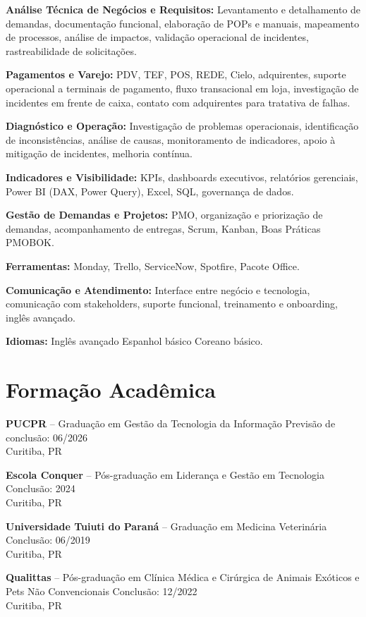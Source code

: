 \documentclass[11pt,a4paper]{article}
\begin{document}
\textbf{Análise Técnica de Negócios e Requisitos:} Levantamento e detalhamento de demandas, documentação funcional, elaboração de POPs e manuais, mapeamento de processos, análise de impactos, validação operacional de incidentes, rastreabilidade de solicitações.

\textbf{Pagamentos e Varejo:} PDV, TEF, POS, REDE, Cielo, adquirentes, suporte operacional a terminais de pagamento, fluxo transacional em loja, investigação de incidentes em frente de caixa, contato com adquirentes para tratativa de falhas.

\textbf{Diagnóstico e Operação:} Investigação de problemas operacionais, identificação de inconsistências, análise de causas, monitoramento de indicadores, apoio à mitigação de incidentes, melhoria contínua.

\textbf{Indicadores e Visibilidade:} KPIs, dashboards executivos, relatórios gerenciais, Power BI (DAX, Power Query), Excel, SQL, governança de dados.

\textbf{Gestão de Demandas e Projetos:} PMO, organização e priorização de demandas, acompanhamento de entregas, Scrum, Kanban, Boas Práticas PMOBOK.

\textbf{Ferramentas:} Monday, Trello, ServiceNow, Spotfire, Pacote Office.

\textbf{Comunicação e Atendimento:} Interface entre negócio e tecnologia, comunicação com stakeholders, suporte funcional, treinamento e onboarding, inglês avançado.

\textbf{Idiomas:} Inglês avançado \textbullet{} Espanhol básico \textbullet{} Coreano básico.

\section*{Formação Acadêmica}

\textbf{PUCPR} -- Graduação em Gestão da Tecnologia da Informação \hfill Previsão de conclusão: 06/2026\\
Curitiba, PR

\textbf{Escola Conquer} -- Pós-graduação em Liderança e Gestão em Tecnologia \hfill Conclusão: 2024\\
Curitiba, PR

\textbf{Universidade Tuiuti do Paraná} -- Graduação em Medicina Veterinária \hfill Conclusão: 06/2019\\
Curitiba, PR

\textbf{Qualittas} -- Pós-graduação em Clínica Médica e Cirúrgica de Animais Exóticos e Pets Não Convencionais \hfill Conclusão: 12/2022\\
Curitiba, PR
\end{document}
